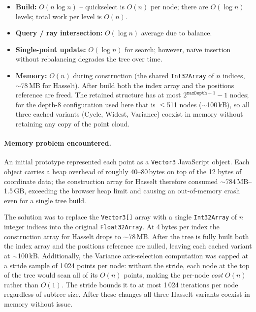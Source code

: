 \documentclass[12pt,a4paper]{article}
\begin{document}
\begin{itemize}
  \item \textbf{Build:} $O(n \log n)$ -- quickselect is $O(n)$ per node;
        there are $O(\log n)$ levels; total work per level is $O(n)$.
  \item \textbf{Query / ray intersection:} $O(\log n)$ average due to balance.
  \item \textbf{Single-point update:} $O(\log n)$ for search; however,
        na\"ive insertion without rebalancing degrades the tree over time.
  \item \textbf{Memory:} $O(n)$ during construction (the shared
        \texttt{Int32Array} of $n$ indices, $\sim$78\,MB for Hasselt). After
        build both the index array and the positions reference are freed.
        The retained structure has at most $2^{\texttt{maxDepth}+1}-1$ nodes;
        for the depth-8 configuration used here that is $\leq$511 nodes
        ($\sim$100\,kB), so all three cached variants (Cycle, Widest, Variance)
        coexist in memory without retaining any copy of the point cloud.
\end{itemize}

\paragraph{Memory problem encountered.}
An initial prototype represented each point as a \texttt{Vector3} JavaScript
object. Each object carries a heap overhead of roughly 40--80\,bytes on top of
the 12 bytes of coordinate data; the construction array for Hasselt therefore
consumed $\sim$784\,MB--1.5\,GB, exceeding the browser heap limit and causing
an out-of-memory crash even for a single tree build.

The solution was to replace the \texttt{Vector3[]} array with a single
\texttt{Int32Array} of $n$ integer indices into the original \texttt{Float32Array}.
At 4\,bytes per index the construction array for Hasselt drops to $\sim$78\,MB.
After the tree is fully built both the index array and the positions reference
are nulled, leaving each cached variant at $\sim$100\,kB.
Additionally, the Variance axis-selection computation was capped at a stride
sample of 1\,024 points per node: without the stride, each node at the top of
the tree would scan all of its $O(n)$ points, making the per-node \emph{cost}
$O(n)$ rather than $O(1)$. The stride bounds it to at most 1\,024 iterations
per node regardless of subtree size. After these changes all three Hasselt
variants coexist in memory without issue.
\end{document}
